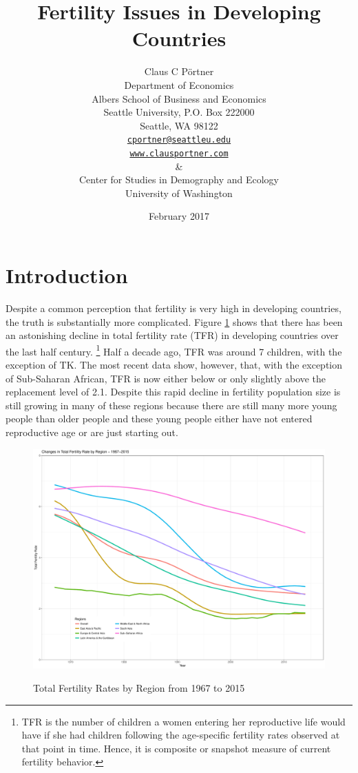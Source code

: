 \documentclass[letterpaper,12pt]{article}
\title{Fertility Issues in Developing Countries}
\author{Claus C P\"ortner\\
    Department of Economics\\
    Albers School of Business and Economics\\
    Seattle University, P.O. Box 222000\\
    Seattle, WA 98122\\
    \href{mailto:cportner@seattleu.edu}{\texttt{cportner@seattleu.edu}}\\
    \href{http://www.clausportner.com}{\texttt{www.clausportner.com}}\\
    \& \\
    Center for Studies in Demography and Ecology \\
    University of Washington\\ \vspace{2cm}
    }
\date{February 2017}
\begin{document}
\graphicspath{{../figures/}}

\maketitle
\thispagestyle{empty}


\newpage

\section{Introduction}

Despite a common perception that fertility is very high in developing countries,
the truth is substantially more complicated.
Figure \ref{fig:TFR} shows that there has been an astonishing decline in total 
fertility rate (TFR) in developing countries over the last half century.%
\footnote{
TFR is the number of children a women entering her reproductive life
would have if she had children following the age-specific fertility
rates observed at that point in time.
Hence, it is composite or snapshot measure of current fertility
behavior.
}
Half a decade ago, TFR was around 7 children, with the exception
of TK.
The most recent data show, however, that, with the exception of 
Sub-Saharan African, TFR is now either below or only slightly 
above the replacement level of 2.1.
Despite this rapid decline in fertility population size is still
growing in many of these regions because there are still many
more young people than older people and these young people either
have not entered reproductive age or are just starting out.

\begin{figure}[hp]
    \centering
    \caption{Total Fertility Rates by Region from 1967 to 2015}
    \includegraphics[width=0.75\linewidth]{totalFertilityRates}
    \label{fig:TFR}
\end{figure}
\end{document}
